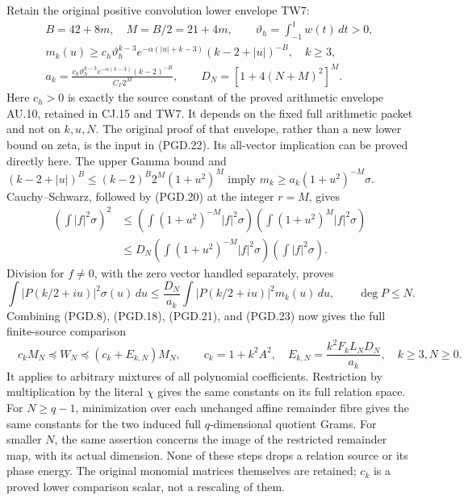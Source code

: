 Retain the original positive convolution lower envelope TW7:
\[
 \begin{gathered}
 B=42+8m,\quad M=B/2=21+4m,\qquad
 \vartheta_h=\int_{-1}^1w(t)\,dt>0,\\
 m_k(u)\geq c_h\vartheta_h^{k-3}
       e^{-\alpha(|u|+k-3)}(k-2+|u|)^{-B},\quad k\geq3,\\
 a_k=\frac{c_h\vartheta_h^{k-3}e^{-\alpha(k-3)}(k-2)^{-B}}
                   {C_\Gamma2^M},\qquad
 D_N=[1+4(N+M)^2]^M.
 \end{gathered}
 \tag{PGD.22}\label{eq:pgd-original-lower}
\]
Here \(c_h>0\) is exactly the source constant of the proved arithmetic
envelope AU.10, retained in CJ.15 and TW7. It depends on the fixed
full arithmetic packet and not on \(k,u,N\). The original proof of
that envelope, rather than a new lower bound on zeta, is the input in
(PGD.22). Its all-vector implication can be proved directly here.
The upper Gamma bound and
\((k-2+|u|)^B\leq(k-2)^B2^M(1+u^2)^M\) imply
\(m_k\geq a_k(1+u^2)^{-M}\sigma\).
Cauchy--Schwarz, followed by (PGD.20) at the integer \(r=M\), gives
\[
 \begin{split}
 \left(\int|f|^2\sigma\right)^2
 &\leq\left(\int(1+u^2)^{-M}|f|^2\sigma\right)
       \left(\int(1+u^2)^M|f|^2\sigma\right)\\
 &\leq D_N\left(\int(1+u^2)^{-M}|f|^2\sigma\right)
                   \left(\int|f|^2\sigma\right).
 \end{split}
\]
Division for \(f\ne0\), with the zero vector handled separately,
proves
\[
 \int|P(k/2+iu)|^2\sigma(u)\,du
 \leq\frac{D_N}{a_k}
           \int|P(k/2+iu)|^2m_k(u)\,du,\qquad \deg P\leq N.
 \tag{PGD.23}\label{eq:pgd-sigma-to-actual}
\]
Combining (PGD.8), (PGD.18), (PGD.21), and (PGD.23) now gives
the full finite-source comparison
\[
 \boxed{\quad
 c_kM_N\preceq W_N\preceq(c_k+E_{k,N})M_N,\qquad
 c_k=1+k^2A^2,\quad
 E_{k,N}=\frac{k^2F_kL_ND_N}{a_k},\quad k\geq3, N\geq0.
 \quad}
 \tag{PGD.24}\label{eq:pgd-full-window}
\]
It applies to arbitrary mixtures of all polynomial coefficients.
Restriction by multiplication by the literal \(\chi\) gives the same
constants on its full relation space. For \(N\geq q-1\), minimization
over each unchanged affine remainder fibre gives the same constants
for the two induced full \(q\)-dimensional quotient Grams. For smaller
\(N\), the same assertion concerns the image of the restricted
remainder map, with its actual dimension. None of these steps drops a relation source or its
phase energy. The original monomial matrices themselves are retained;
\(c_k\) is a proved lower comparison scalar, not a rescaling of them.

